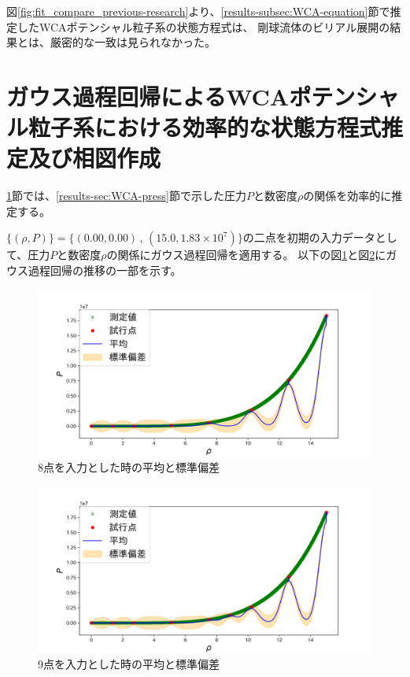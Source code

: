 \documentclass[titlepage]{jsreport}
\begin{document}
{{{図\ref{fig:fit_compare_previous-research}より、\ref{results-subsec:WCA-equation}節で推定したWCAポテンシャル粒子系の状態方程式は、
剛球流体のビリアル展開の結果とは、厳密的な一致は見られなかった。


\newpage
\section{ガウス過程回帰によるWCAポテンシャル粒子系における効率的な状態方程式推定及び相図作成}\label{results-sec:Gauss}
\ref{results-sec:Gauss}節では、\ref{results-sec:WCA-press}節で示した圧力$P$と数密度$\rho$の関係を効率的に推定する。

$\{(\rho,P)\}=\{(0.00,0.00)\,,\,(15.0,1.83×10^7)\}$の二点を初期の入力データとして、圧力$P$と数密度$\rho$の関係にガウス過程回帰を適用する。
以下の図\ref{fig:8plot}と図\ref{fig:9plot}にガウス過程回帰の推移の一部を示す。


\begin{figure}[htbp]
    \begin{center}
        \includegraphics[width=13cm]{fig/8plot-Gauss.png}
    \end{center}
    \caption{8点を入力とした時の平均と標準偏差}
    \label{fig:8plot}
\end{figure}

\begin{figure}[htbp]
    \begin{center}
        \includegraphics[width=13cm]{fig/9plot-Gauss.png}
    \end{center}
    \caption{9点を入力とした時の平均と標準偏差}
    \label{fig:9plot}
\end{figure}

}}}
\end{document}
